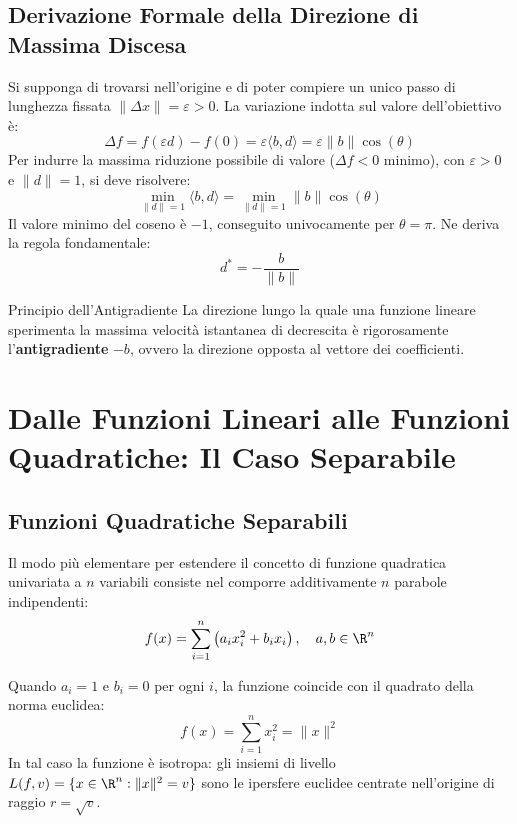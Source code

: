 \subsection{Derivazione Formale della Direzione di Massima Discesa}
Si supponga di trovarsi nell'origine e di poter compiere un unico passo di lunghezza fissata $\|\Delta x\| = \varepsilon > 0$. La variazione indotta sul valore dell'obiettivo \`e:
\begin{equation}
\Delta f = f(\varepsilon d) - f(0) = \varepsilon \langle b, d \rangle = \varepsilon \|b\| \cos(\theta)
\end{equation}
Per indurre la massima riduzione possibile di valore ($\Delta f < 0$ minimo), con $\varepsilon > 0$ e $\|d\| = 1$, si deve risolvere:
\begin{equation}
\min_{\|d\| = 1} \langle b, d \rangle = \min_{\|d\|=1} \|b\| \cos(\theta)
\end{equation}
Il valore minimo del coseno \`e $-1$, conseguito univocamente per $\theta = \pi$. Ne deriva la regola fondamentale:
\begin{equation}
d^* = -\frac{b}{\|b\|}
\end{equation}

\begin{noteblock}{Principio dell'Antigradiente}
La direzione lungo la quale una funzione lineare sperimenta la massima velocit\`a istantanea di decrescita \`e rigorosamente l'\textbf{antigradiente} $-b$, ovvero la direzione opposta al vettore dei coefficienti.
\end{noteblock}


\FloatBarrier
\section{Dalle Funzioni Lineari alle Funzioni Quadratiche: Il Caso Separabile}
\label{sec:opt-quadratico-separabile}

\subsection{Funzioni Quadratiche Separabili}
Il modo pi\`u elementare per estendere il concetto di funzione quadratica univariata a $n$ variabili consiste nel comporre additivamente $n$ parabole indipendenti:
\begin{equation}
f(x) = \sum_{i=1}^n \left( a_i x_i^2 + b_i x_i \right), \quad a, b \in \R^n
\end{equation}

Quando $a_i = 1$ e $b_i = 0$ per ogni $i$, la funzione coincide con il quadrato della norma euclidea:
\begin{equation}
f(x) = \sum_{i=1}^n x_i^2 = \|x\|^2
\end{equation}
In tal caso la funzione \`e isotropa: gli insiemi di livello $L(f, v) = \{x \in \R^n : \|x\|^2 = v\}$ sono le ipersfere euclidee centrate nell'origine di raggio $r = \sqrt{v}$.

